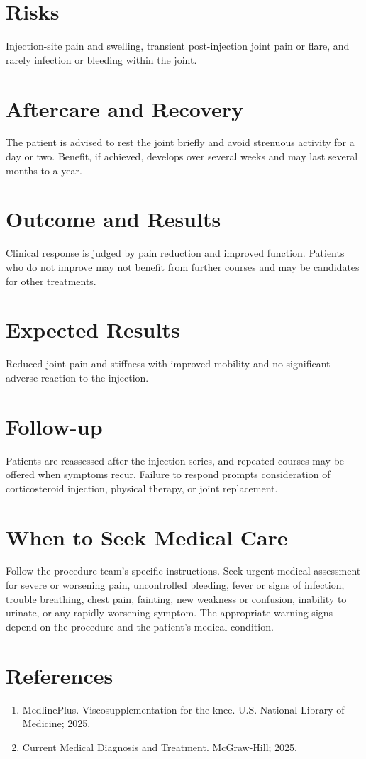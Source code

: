 \section*{Risks}
Injection-site pain and swelling, transient post-injection joint pain or flare, and rarely infection or bleeding within the joint.

\section*{Aftercare and Recovery}
The patient is advised to rest the joint briefly and avoid strenuous activity for a day or two. Benefit, if achieved, develops over several weeks and may last several months to a year.
\section*{Outcome and Results}
Clinical response is judged by pain reduction and improved function. Patients who do not improve may not benefit from further courses and may be candidates for other treatments.
\section*{Expected Results}
Reduced joint pain and stiffness with improved mobility and no significant adverse reaction to the injection.
\section*{Follow-up}
Patients are reassessed after the injection series, and repeated courses may be offered when symptoms recur. Failure to respond prompts consideration of corticosteroid injection, physical therapy, or joint replacement.
\section*{When to Seek Medical Care}
Follow the procedure team's specific instructions. Seek urgent medical assessment for severe or worsening pain, uncontrolled bleeding, fever or signs of infection, trouble breathing, chest pain, fainting, new weakness or confusion, inability to urinate, or any rapidly worsening symptom. The appropriate warning signs depend on the procedure and the patient's medical condition.

\section*{References}
\begin{enumerate}
  \item MedlinePlus. Viscosupplementation for the knee. U.S. National Library of Medicine; 2025.
  \item Current Medical Diagnosis and Treatment. McGraw-Hill; 2025.
\end{enumerate}

\clearpage
